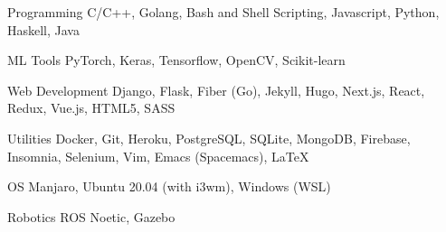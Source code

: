 

\begin{cvskills}

  \cvskill
    {Programming} %
    {C/C++, Golang, Bash and Shell Scripting, Javascript, Python, Haskell, Java} %
    
  \cvskill
  {ML Tools} %
  {PyTorch, Keras, Tensorflow, OpenCV, Scikit-learn} %

  \cvskill
    {Web Development} %
    {Django, Flask, Fiber (Go), Jekyll, Hugo, Next.js, React, Redux, Vue.js, HTML5, SASS} %

  \cvskill
  {Utilities} %
  {Docker, Git, Heroku, PostgreSQL, SQLite, MongoDB, Firebase, Insomnia, Selenium, Vim, Emacs (Spacemacs), \LaTeX} %

  \cvskill
  {OS} %
  {Manjaro, Ubuntu 20.04 (with i3wm), Windows (WSL)} %

  \cvskill
  {Robotics} %
  {ROS Noetic, Gazebo} %
\end{cvskills}
